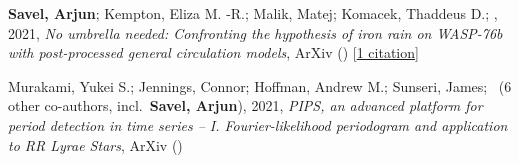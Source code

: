 \item[{\color{numcolor}\scriptsize2}] \textbf{Savel, Arjun}; Kempton, Eliza M. -R.; Malik, Matej; Komacek, Thaddeus D.; \etal, 2021, \emph{No umbrella needed: Confronting the hypothesis of iron rain on WASP-76b with post-processed general circulation models}, ArXiv () [\href{https://ui.adsabs.harvard.edu/abs/2021arXiv210900163S}{1 citation}]

\item[{\color{numcolor}\scriptsize1}] Murakami, Yukei S.; Jennings, Connor; Hoffman, Andrew M.; Sunseri, James; \etal\ ({6} other co-authors, incl.\ \textbf{Savel, Arjun}), 2021, \emph{PIPS, an advanced platform for period detection in time series -- I. Fourier-likelihood periodogram and application to RR Lyrae Stars}, ArXiv ()